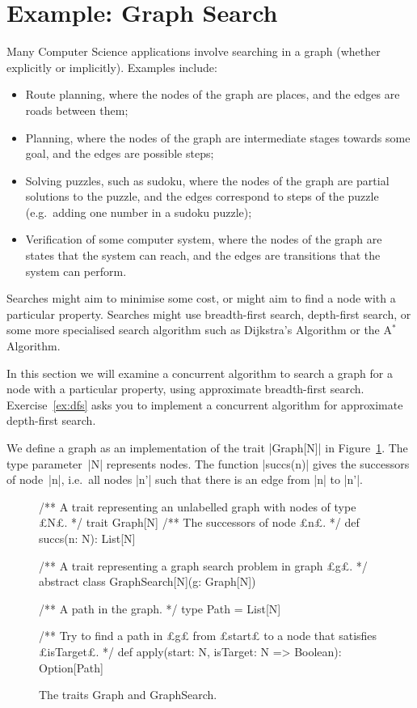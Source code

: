 \section{Example: Graph Search}
\label{sec:BFS}

Many Computer Science applications involve searching in a graph (whether
explicitly or implicitly).  Examples include:
%
\begin{itemize}
\item Route planning, where the nodes of the graph are places, and the edges
  are roads between them;

\item Planning, where the nodes of the graph are intermediate stages towards
  some goal, and the edges are possible steps;

\item Solving puzzles, such as sudoku, where the nodes of the graph are
  partial solutions to the puzzle, and the edges correspond to steps of the
  puzzle (e.g.~adding one number in a sudoku puzzle);

\item Verification of some computer system, where the nodes of the graph are
  states that the system can reach, and the edges are transitions that the
  system can perform.  
\end{itemize}
%
Searches might aim to minimise some cost, or might aim to find a node with a
particular property.  Searches might use breadth-first search, depth-first
search, or some more specialised search algorithm such as Dijkstra's Algorithm
or the A$^*$ Algorithm.

In this section we will examine a concurrent algorithm to search a graph for a
node with a particular property, using approximate breadth-first search.
Exercise~\ref{ex:dfs} asks you to implement a concurrent algorithm for
approximate depth-first search.

We define a graph as an implementation of the trait |Graph[N]| in
Figure~\ref{fig:graph}.  The type parameter~|N| represents nodes.  The
function |succs(n)| gives the successors of node~|n|, i.e.~all nodes |n'| such
that there is an edge from |n| to |n'|.


\begin{figure}
\begin{scala}
/** A trait representing an unlabelled graph with nodes of type £N£. */
trait Graph[N]{
  /** The successors of node £n£. */
  def succs(n: N): List[N]
}

/** A trait representing a graph search problem in graph £g£. */
abstract class GraphSearch[N](g: Graph[N]){
  /** A path in the graph. */
  type Path = List[N]

  /** Try to find a path in £g£ from £start£ to a node that satisfies £isTarget£. */
  def apply(start: N, isTarget: N => Boolean): Option[Path]
}
\end{scala}
\caption{The traits {\scalashape Graph} and {\scalashape GraphSearch}.}
\label{fig:graph}
\end{figure}

